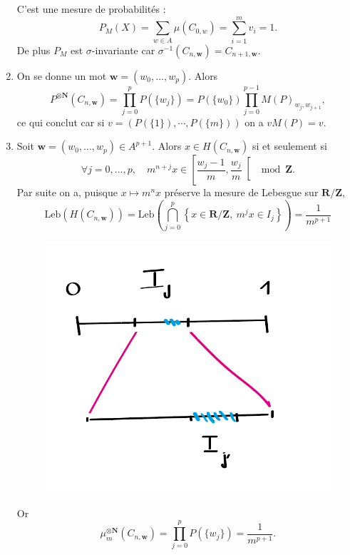 \documentclass[a4paper,12pt,openany]{article}
\theoremstyle{plain}
\theoremstyle{definition}
\newcommand{\R}{\mathbf{R}}
\newcommand{\Z}{\mathbf{Z}}
\newcommand{\N}{\mathbf{N}}
\begin{document}
\begin{enumerate}
C'est une mesure de probabilit\'es :
$$
P_M(X) = \sum_{w \in A} \mu(C_{0, w}) = \sum_{i=1}^m v_i = 1.
$$
De plus $P_M$ est $\sigma$-invariante car $\sigma^{-1}(C_{n,\mathbf{w}}) = C_{n+1, \mathbf{w}}.$


\item On se donne un mot $\mathbf{w} = (w_0, \dots, w_{p})$. Alors
$$
P^{\otimes \N}(C_{n,\mathbf{w}}) = \prod_{j=0}^p P(\{w_j\}) = P(\{w_0\}) \prod_{j=0}^{p-1} M(P)_{w_j, w_{j+1}},
$$
ce qui conclut car si $v = (P(\{1\}), \cdots, P(\{m\}))$ on a  $vM(P) = v.$



\item Soit $\mathbf{w} = (w_0, \dots, w_p) \in A^{p+1}$. Alors $x \in H(C_{n, \mathbf{w}})$ si et seulement si
$$
\forall j = 0, \dots, p,  \quad m^{n+j}x \in \left[\frac{w_j-1}{m}, \frac{w_j}{m}\right[ \mod \Z.
$$
Par suite on a, puisque $x \mapsto m^nx$ pr\'eserve la mesure de Lebesgue sur $\R / \Z$,
$$
\mathrm{Leb}(H(C_{n, \mathbf{w}})) = \mathrm{Leb}\left(\bigcap_{j=0}^p \left\{x \in \R/\Z,~m^jx \in I_j\right\} \right) = \frac{1}{m^{p+1}}
$$
\begin{figure}
\begin{center}
\includegraphics[scale = 0.5]{interval.png}
\end{center}
\end{figure}
Or
$$
\mu_m^{\otimes \N}(C_{n, \mathbf{w}}) = \prod_{j=0}^p P(\{w_j\}) = \frac{1}{m^{p+1}}.
$$



\end{enumerate}
\end{document}
